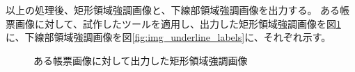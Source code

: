 以上の処理後、矩形領域強調画像と、下線部領域強調画像を出力する。
ある帳票画像に対して、試作したツールを適用し、出力した矩形領域強調画像を図\ref{fig:img_rect_labels}に、下線部領域強調画像を図\ref{fig:img_underline_labels}に、それぞれ示す。
\begin{figure}[tp]
    \begin{center}
        \caption{ある帳票画像に対して出力した矩形領域強調画像}
        \label{fig:img_rect_labels}
    \end{center}
\end{figure}
